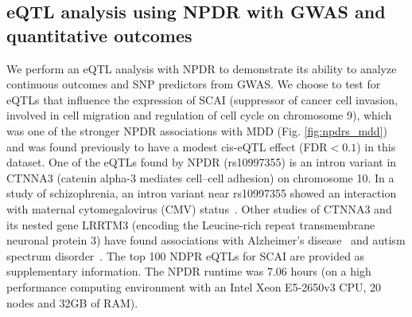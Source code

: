 \documentclass{bioinfo}
\begin{document}
\subsection{eQTL analysis using NPDR with GWAS and quantitative outcomes}

We perform an eQTL analysis with NPDR to demonstrate its ability to analyze continuous outcomes and SNP predictors from GWAS.
We choose to test for eQTLs that influence the expression of SCAI (suppressor of cancer cell invasion, involved in cell migration and regulation of cell cycle on chromosome 9), which was one of the stronger NPDR associations with MDD (Fig. \ref{fig:npdrs_mdd}) and was found previously to have a modest cis-eQTL effect (FDR$<0.1$) in this dataset\cite{mostafavi14}.
One of the eQTLs found by NPDR (rs10997355) is an intron variant in CTNNA3 (catenin alpha-3 mediates cell–cell adhesion) on chromosome 10.
In a study of schizophrenia, an intron variant near rs10997355 showed an interaction with maternal cytomegalovirus (CMV) status~\cite{borglum2014genome}.
Other studies of CTNNA3 and its nested gene LRRTM3 (encoding the Leucine-rich repeat transmembrane neuronal protein 3) have found associations with Alzheimer's disease~\cite{miyashita2007genetic} and autism spectrum disorder~\cite{wang2009common}.
The top 100 NDPR eQTLs for SCAI are provided as supplementary information.
The NPDR runtime was 7.06 hours (on a high performance computing environment with an Intel Xeon E5-2650v3 CPU, 20 nodes and 32GB of RAM).
\end{document}
